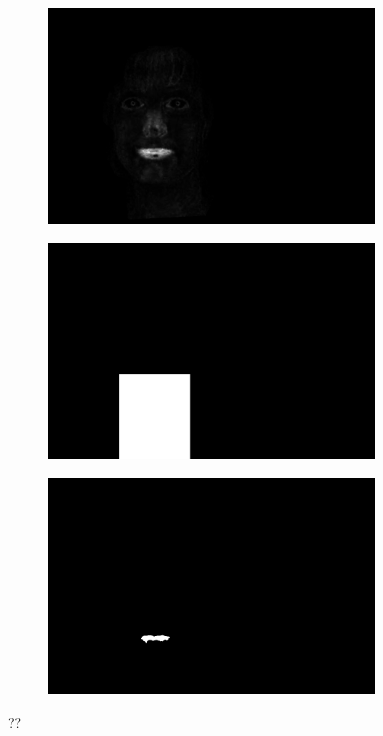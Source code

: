 \begin{figure}[H]
\centering

\begin{subfigure}{.33\textwidth}
  \centering
  \includegraphics[width=0.95\textwidth]{img/fd/MouthMask.png}
  \caption{}
\end{subfigure}%
\begin{subfigure}{.33\textwidth}
  \centering
  \includegraphics[width=0.95\textwidth]{img/fd/notNonMouthMask.png}
  \caption{}
\end{subfigure}%
\begin{subfigure}{.33\textwidth}
  \centering
  \includegraphics[width=0.95\textwidth]{img/fd/MouthBlob.png}
  \caption{}
\end{subfigure}%

\caption{??}
\label{fig:mouthMap}
\end{figure}
